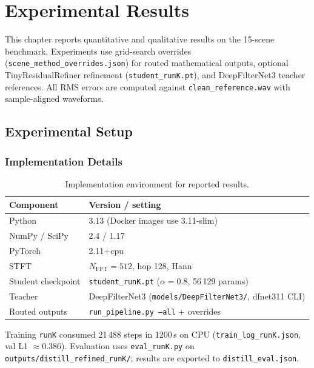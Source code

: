 \chapter{Experimental Results}
\label{ch:experiments}

This chapter reports quantitative and qualitative results on the 15-scene benchmark. Experiments use grid-search overrides (\texttt{scene\_method\_overrides.json}) for routed mathematical outputs, optional TinyResidualRefiner refinement (\texttt{student\_runK.pt}), and DeepFilterNet3 teacher references. All RMS errors are computed against \texttt{clean\_reference.wav} with sample-aligned waveforms.

\section{Experimental Setup}
\label{sec:exp_setup}

\subsection{Implementation Details}

\begin{table}[H]
  \centering
  \caption{Implementation environment for reported results.}
  \label{tab:exp_impl}
  \begin{tabular}{ll}
    \toprule
    \textbf{Component} & \textbf{Version / setting} \\
    \midrule
    Python               & 3.13 (Docker images use 3.11-slim) \\
    NumPy / SciPy        & 2.4 / 1.17 \\
    PyTorch              & 2.11+cpu \\
    STFT                 & $N_{\mathrm{FFT}}=512$, hop 128, Hann \\
    Student checkpoint   & \texttt{student\_runK.pt} ($\alpha=0.8$, 56\,129 params) \\
    Teacher              & DeepFilterNet3 (\texttt{models/DeepFilterNet3/}, dfnet311 CLI) \\
    Routed outputs       & \texttt{run\_pipeline.py --all} + overrides \\
    \bottomrule
  \end{tabular}
\end{table}

Training \texttt{runK} consumed 21\,488 steps in 1200\,s on CPU (\texttt{train\_log\_runK.json}, val L1 $\approx 0.386$). Evaluation uses \texttt{eval\_runK.py} on \texttt{outputs/distill\_refined\_runK/}; results are exported to \texttt{distill\_eval.json}.

